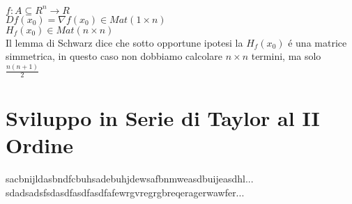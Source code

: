\observation
$f:A\subseteq R^n\rightarrow R$\\
$Df(x_0)=\nabla f(x_0) \in Mat(1\times n)$\\
$H_f(x_0)\in Mat(n\times n)$\\
Il lemma di Schwarz dice che sotto opportune ipotesi la $H_f(x_0)$ \'e una matrice simmetrica, in questo caso non dobbiamo calcolare $n\times n$ termini, ma solo $\frac{n(n+1)}{2}$

\section{Sviluppo in Serie di Taylor al II Ordine}
sacbnijldasbndfcbuhsadebuhjdewsafbnmweasdbuijeasdhl...\\
sdadsadsfsdasdfasdfasdfafewrgvregrgbreqeragerwawfer...\\


